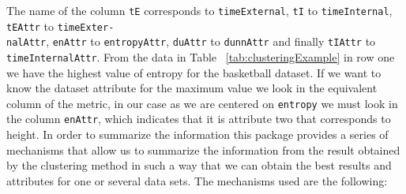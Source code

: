 The name of the column \texttt{tE} corresponds to \texttt{timeExternal}, \texttt{tI} to \texttt{timeInternal}, \texttt{tEAttr} to \texttt{timeExter-}\\
\texttt{nalAttr}, \texttt{enAttr} to \texttt{entropyAttr}, \texttt{duAttr} to \texttt{dunnAttr} and finally \texttt{tIAttr} to \texttt{timeInternalAttr}. From the data in Table ~\ref{tab:clusteringExample} in row one we have the highest value of entropy for the basketball dataset. If we want to know the dataset attribute for the maximum value we look in the equivalent column of the metric, in our case as we are centered on \texttt{entropy} we must look in the column \texttt{enAttr}, which indicates that it is attribute two that corresponds to height. In order to summarize the information this package provides a series of mechanisms that allow us to summarize the information from the result obtained by the clustering method in such a way that we can obtain the best results and attributes for one or several data sets. The mechanisms used are the following:

